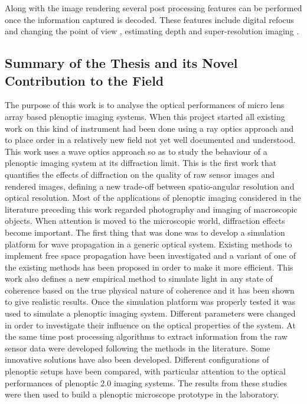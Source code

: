 Along with the image rendering several post processing features can be performed once the information captured is decoded. These features include digital refocus and changing the point of view \cite{ng2006digital}, estimating depth \cite{ji2015depth,wetzstein2011computational,georgiev2012multifocus,georgiev2006light} and super-resolution imaging \cite{bishop2009light,shroff2013image,georgiev2009superresolution,georgiev2015plenoptic}. \\
\subsection*{Summary of the Thesis and its Novel Contribution to the Field}
The purpose of this work is to analyse the optical performances of micro lens array based plenoptic imaging systems. When this project started all existing work on this kind of instrument had been done using a ray optics approach and to place order in a relatively new field not yet well documented and understood. This work uses a wave optics approach so as to study the behaviour of a plenoptic imaging system at its diffraction limit. This is the first work that quantifies the effects of diffraction on the quality of raw sensor images and rendered images, defining a new trade-off between spatio-angular resolution and optical resolution. Most of the applications of plenoptic imaging considered in the literature preceding this work regarded photography and imaging of macroscopic objects. When attention is moved to the microscopic world, diffraction effects become important. The first thing that was done was to develop a simulation platform for wave propagation in a generic optical system. Existing methods to implement free space propagation have been investigated and a variant of one of the existing methods has been proposed in order to make it more efficient. This work also defines a new empirical method to simulate light in any state of coherence based on the true physical nature of coherence and it has been shown to give realistic results. Once the simulation platform was properly tested it was used to simulate a plenoptic imaging system. Different parameters were changed in order to investigate their influence on the optical properties of the system. At the same time post processing algorithms to extract information from the raw sensor data were developed following the methods in the literature. Some innovative solutions have also been developed. Different configurations of plenoptic setups have been compared, with particular attention to the optical performances of plenoptic 2.0 imaging systems. The results from these studies were then used to build a plenoptic microscope prototype in the laboratory.

